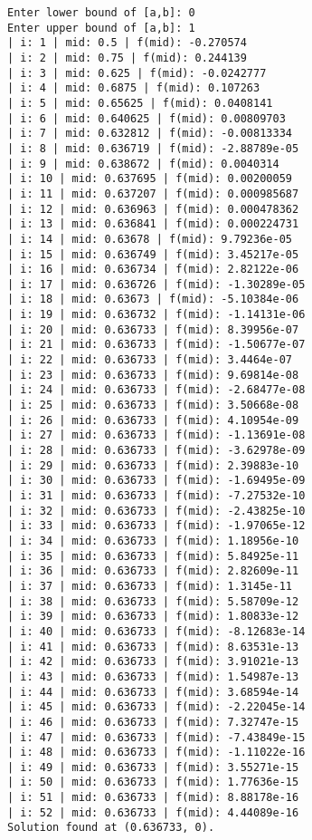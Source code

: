 \documentclass[a4paper]{article}
\begin{document}
\begin{verbatim}
Enter lower bound of [a,b]: 0
Enter upper bound of [a,b]: 1
| i: 1 | mid: 0.5 | f(mid): -0.270574
| i: 2 | mid: 0.75 | f(mid): 0.244139
| i: 3 | mid: 0.625 | f(mid): -0.0242777
| i: 4 | mid: 0.6875 | f(mid): 0.107263
| i: 5 | mid: 0.65625 | f(mid): 0.0408141
| i: 6 | mid: 0.640625 | f(mid): 0.00809703
| i: 7 | mid: 0.632812 | f(mid): -0.00813334
| i: 8 | mid: 0.636719 | f(mid): -2.88789e-05
| i: 9 | mid: 0.638672 | f(mid): 0.0040314
| i: 10 | mid: 0.637695 | f(mid): 0.00200059
| i: 11 | mid: 0.637207 | f(mid): 0.000985687
| i: 12 | mid: 0.636963 | f(mid): 0.000478362
| i: 13 | mid: 0.636841 | f(mid): 0.000224731
| i: 14 | mid: 0.63678 | f(mid): 9.79236e-05
| i: 15 | mid: 0.636749 | f(mid): 3.45217e-05
| i: 16 | mid: 0.636734 | f(mid): 2.82122e-06
| i: 17 | mid: 0.636726 | f(mid): -1.30289e-05
| i: 18 | mid: 0.63673 | f(mid): -5.10384e-06
| i: 19 | mid: 0.636732 | f(mid): -1.14131e-06
| i: 20 | mid: 0.636733 | f(mid): 8.39956e-07
| i: 21 | mid: 0.636733 | f(mid): -1.50677e-07
| i: 22 | mid: 0.636733 | f(mid): 3.4464e-07
| i: 23 | mid: 0.636733 | f(mid): 9.69814e-08
| i: 24 | mid: 0.636733 | f(mid): -2.68477e-08
| i: 25 | mid: 0.636733 | f(mid): 3.50668e-08
| i: 26 | mid: 0.636733 | f(mid): 4.10954e-09
| i: 27 | mid: 0.636733 | f(mid): -1.13691e-08
| i: 28 | mid: 0.636733 | f(mid): -3.62978e-09
| i: 29 | mid: 0.636733 | f(mid): 2.39883e-10
| i: 30 | mid: 0.636733 | f(mid): -1.69495e-09
| i: 31 | mid: 0.636733 | f(mid): -7.27532e-10
| i: 32 | mid: 0.636733 | f(mid): -2.43825e-10
| i: 33 | mid: 0.636733 | f(mid): -1.97065e-12
| i: 34 | mid: 0.636733 | f(mid): 1.18956e-10
| i: 35 | mid: 0.636733 | f(mid): 5.84925e-11
| i: 36 | mid: 0.636733 | f(mid): 2.82609e-11
| i: 37 | mid: 0.636733 | f(mid): 1.3145e-11
| i: 38 | mid: 0.636733 | f(mid): 5.58709e-12
| i: 39 | mid: 0.636733 | f(mid): 1.80833e-12
| i: 40 | mid: 0.636733 | f(mid): -8.12683e-14
| i: 41 | mid: 0.636733 | f(mid): 8.63531e-13
| i: 42 | mid: 0.636733 | f(mid): 3.91021e-13
| i: 43 | mid: 0.636733 | f(mid): 1.54987e-13
| i: 44 | mid: 0.636733 | f(mid): 3.68594e-14
| i: 45 | mid: 0.636733 | f(mid): -2.22045e-14
| i: 46 | mid: 0.636733 | f(mid): 7.32747e-15
| i: 47 | mid: 0.636733 | f(mid): -7.43849e-15
| i: 48 | mid: 0.636733 | f(mid): -1.11022e-16
| i: 49 | mid: 0.636733 | f(mid): 3.55271e-15
| i: 50 | mid: 0.636733 | f(mid): 1.77636e-15
| i: 51 | mid: 0.636733 | f(mid): 8.88178e-16
| i: 52 | mid: 0.636733 | f(mid): 4.44089e-16
Solution found at (0.636733, 0).
\end{verbatim}
\end{document}
